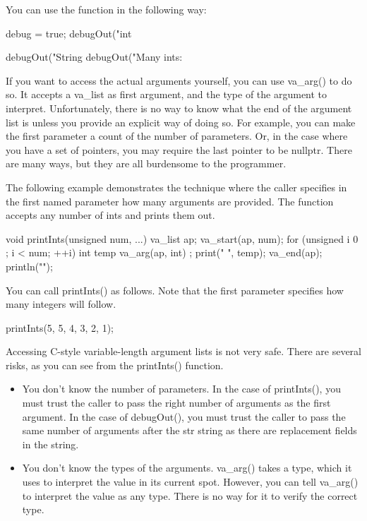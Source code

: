 You can use the function in the following way:

\begin{cpp}
debug = true;
debugOut("int %

debugOut("String %
debugOut("Many ints: %
\end{cpp}


If you want to access the actual arguments yourself, you can use va\_arg() to do so. It accepts a va\_list as first argument, and the type of the argument to interpret. Unfortunately, there is no way to know what the end of the argument list is unless you provide an explicit way of doing so. For example, you can make the first parameter a count of the number of parameters. Or, in the case where you have a set of pointers, you may require the last pointer to be nullptr. There are many ways, but they are all burdensome to the programmer.

The following example demonstrates the technique where the caller specifies in the first named parameter how many arguments are provided. The function accepts any number of ints and prints them out.

\begin{cpp}
void printInts(unsigned num, ...)
{
    va_list ap;
    va_start(ap, num);
    for (unsigned i { 0 }; i < num; ++i) {
        int temp { va_arg(ap, int) };
        print("{} ", temp);
    }
    va_end(ap);
    println("");
}
\end{cpp}

You can call printInts() as follows. Note that the first parameter specifies how many integers will follow.

\begin{cpp}
printInts(5, 5, 4, 3, 2, 1);
\end{cpp}


Accessing C-style variable-length argument lists is not very safe. There are several risks, as you can see from the printInts() function.

\begin{itemize}
\item
You don’t know the number of parameters. In the case of printInts(), you must trust the caller to pass the right number of arguments as the first argument. In the case of debugOut(), you must trust the caller to pass the same number of arguments after the str string as there are replacement fields in the string.

\item
You don’t know the types of the arguments. va\_arg() takes a type, which it uses to interpret the value in its current spot. However, you can tell va\_arg() to interpret the value as any type. There is no way for it to verify the correct type.
\end{itemize}

